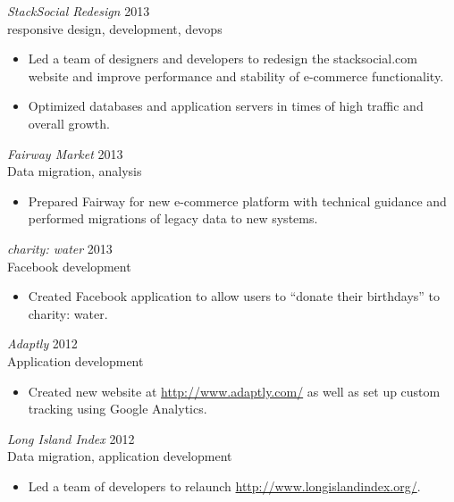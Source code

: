 \documentclass[line,margin]{res}
\begin{document}
\begin{resume}
    {\sl StackSocial Redesign}
    \hfill 2013 \\
    responsive design, development, devops
    \begin{itemize} \itemsep -2pt
        \item
            Led a team of designers and developers to redesign the stacksocial.com website 
            and improve performance and stability of e-commerce functionality.
        \item
            Optimized databases and application servers in times of high traffic and overall
            growth.
    \end{itemize}

    {\sl Fairway Market}
    \hfill 2013 \\
    Data migration, analysis
    \begin{itemize} \itemsep -2pt
        \item
            Prepared Fairway for new e-commerce platform with technical
            guidance and performed migrations of legacy data to new systems.

    \end{itemize}

    {\sl charity: water}
    \hfill 2013 \\
    Facebook development
    \begin{itemize} \itemsep -2pt
        \item
            Created Facebook application to allow users to ``donate their
            birthdays'' to charity: water.

    \end{itemize}

    {\sl Adaptly}
    \hfill 2012 \\
    Application development
    \begin{itemize} \itemsep -2pt
        \item
            Created new website at \url{http://www.adaptly.com/} as well as
            set up custom tracking using Google Analytics.

    \end{itemize}

    {\sl Long Island Index}
    \hfill 2012 \\
    Data migration, application development
    \begin{itemize} \itemsep -2pt
        \item
            Led a team of developers to relaunch
            \url{http://www.longislandindex.org/}.


\end{itemize}
\end{resume}
\end{document}
